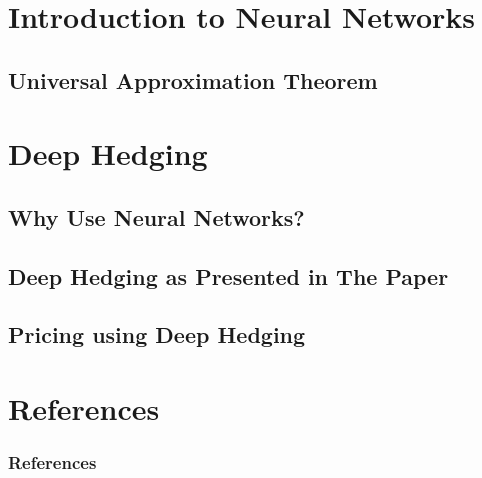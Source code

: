 \documentclass[serif]{beamer}
\begin{document}
\section{Introduction to Neural Networks}
\subsection{Universal Approximation Theorem}

\section{Deep Hedging}

\subsection{Why Use Neural Networks?}
\subsection{Deep Hedging as Presented in The Paper}
\subsection{Pricing using Deep Hedging}

\section{References}
\begin{frame}
    \frametitle{References}
    
    
\end{frame}
\end{document}

